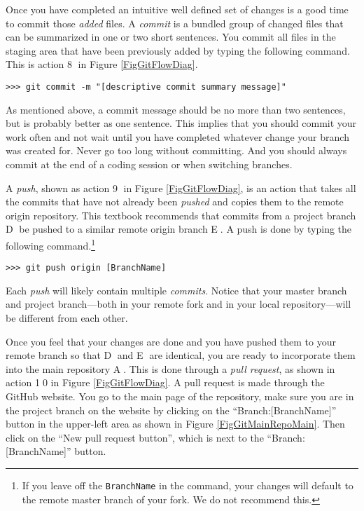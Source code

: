     Once you have completed an intuitive well defined set of changes is a good time to commit those \textit{added} files. A \textit{commit} is a bundled group of changed files that can be summarized in one or two short sentences. You commit all files in the staging area that have been previously added by typing the following command. This is action \textcircled{8} in Figure \ref{FigGitFlowDiag}.
    \begin{lstlisting}[frame=single]
      >>> git commit -m "[descriptive commit summary message]"
    \end{lstlisting}
    As mentioned above, a commit message should be no more than two sentences, but is probably better as one sentence. This implies that you should commit your work often and not wait until you have completed whatever change your branch was created for. Never go too long without committing. And you should always commit at the end of a coding session or when switching branches.

    A \textit{push}, shown as action \textcircled{9} in Figure \ref{FigGitFlowDiag}, is an action that takes all the commits that have not already been \textit{pushed} and copies them to the remote origin repository. This textbook recommends that commits from a project branch \textcircled{D} be pushed to a similar remote origin branch \textcircled{E}. A push is done by typing the following command.\footnote{If you leave off the \texttt{BranchName} in the command, your changes will default to the remote master branch of your fork. We do not recommend this.}
    \begin{lstlisting}[frame=single]
      >>> git push origin [BranchName]
    \end{lstlisting}
    Each \textit{push} will likely contain multiple \textit{commits}. Notice that your master branch and project branch---both in your remote fork and in your local repository---will be different from each other.

    Once you feel that your changes are done and you have pushed them to your remote branch so that \textcircled{D} and \textcircled{E} are identical, you are ready to incorporate them into the main repository \textcircled{A}. This is done through a \textit{pull request}, as shown in action \textcircled{10} in Figure \ref{FigGitFlowDiag}. A pull request is made through the GitHub website. You go to the main page of the repository, make sure you are in the project branch on the website by clicking on the ``Branch:[BranchName]'' button in the upper-left area as shown in Figure \ref{FigGitMainRepoMain}. Then click on the ``New pull request button'', which is next to the ``Branch:[BranchName]'' button.

